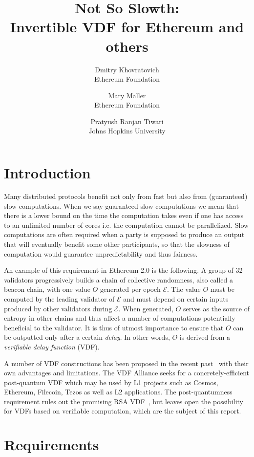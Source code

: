 \documentclass{article}
\title{Not So Slo\sout{w}th:\\  Invertible VDF for Ethereum and others}
\author{Dmitry Khovratovich\\Ethereum Foundation \and Mary Maller\\Ethereum Foundation \and Pratyush Ranjan Tiwari\\Johns Hopkins University}
\begin{document}
\maketitle

\tableofcontents

\section{Introduction}

Many distributed protocols benefit not only from fast but also from (guaranteed) slow computations. 
When we say guaranteed slow computations we mean that there is a lower bound on the time the computation takes even if one has access to an unlimited number of cores i.e. the computation cannot be parallelized.
Slow computations are often required when a party is supposed to produce an output that will eventually benefit some other participants, so that the slowness of computation would guarantee unpredictability and thus fairness.

An example of this requirement in Ethereum 2.0 is the following. A group of 32 validators progressively builds a chain of collective randomness, also called a beacon chain, with one value $O$ generated per epoch $\mathcal{E}$. The value $O$ must be computed by the leading validator of $\mathcal{E}$ and must depend on certain inputs produced by other validators during $\mathcal{E}$. When generated, $O$ serves as the source of entropy in other chains and thus affect a number of computations potentially beneficial to the validator. It is thus of utmost importance to ensure that $O$ can be outputted only after a certain \emph{delay}. In other words, $O$ is derived from a \emph{verifiable delay function} (VDF).

A number of VDF constructions has been proposed in the recent past~\cite{DBLP:journals/ijact/LenstraW17,DBLP:conf/eurocrypt/Wesolowski19,DBLP:conf/crypto/BonehBBF18,DBLP:conf/innovations/Pietrzak19a} with their own advantages and limitations.
The VDF Alliance seeks for a concretely-efficient post-quantum VDF which may be used by L1 projects such as Cosmos, Ethereum, Filecoin, Tezos as well as L2 applications. The post-quantumness requirement rules out the promising RSA VDF~\cite{DBLP:conf/eurocrypt/Wesolowski19,DBLP:conf/innovations/Pietrzak19a}, but leaves open the possibility for VDFs based on verifiable computation, which are the subject of this report.

\section{Requirements}
\end{document}
